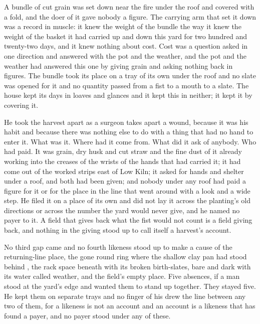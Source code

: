 A bundle of cut grain was set down near the fire under the roof and covered with a fold, and the doer of it gave nobody a figure. The carrying arm that set it down was a record in muscle: it knew the weight of the bundle the way it knew the weight of the basket it had carried up and down this yard for two hundred and twenty-two days, and it knew nothing about cost. Cost was a question asked in one direction and answered with the pot and the weather, and the pot and the weather had answered this one by giving grain and asking nothing back in figures. The bundle took its place on a tray of its own under the roof and no slate was opened for it and no quantity passed from a fist to a mouth to a slate. The house kept its days in loaves and glances and it kept this in neither; it kept it by covering it.

He took the harvest apart as a surgeon takes apart a wound, because it was his habit and because there was nothing else to do with a thing that had no hand to enter it. What was it. Where had it come from. What did it ask of anybody. Who had paid. It was grain, dry husk and cut straw and the fine dust of it already working into the creases of the wrists of the hands that had carried it; it had come out of the worked strips east of Low Kiln; it asked for hands and shelter under a roof, and both had been given; and nobody under any roof had paid a figure for it or for the place in the line that went around with a look and a wide step. He filed it on a place of its own and did not lay it across the planting's old directions or across the number the yard would never give, and he named no payer to it. A field that gives back what the fist would not count is a field giving back, and nothing in the giving stood up to call itself a harvest's account.

No third gap came and no fourth likeness stood up to make a cause of the returning-line place, the gone round ring where the shallow clay pan had stood behind , the rack space beneath  with its broken birth-slates,  bare and dark with its water called weather, and the field's empty place. Five absences, if a man stood at the yard's edge and wanted them to stand up together. They stayed five. He kept them on separate trays and no finger of his drew the line between any two of them, for a likeness is not an account and an account is a likeness that has found a payer, and no payer stood under any of these.

\scenebreak

